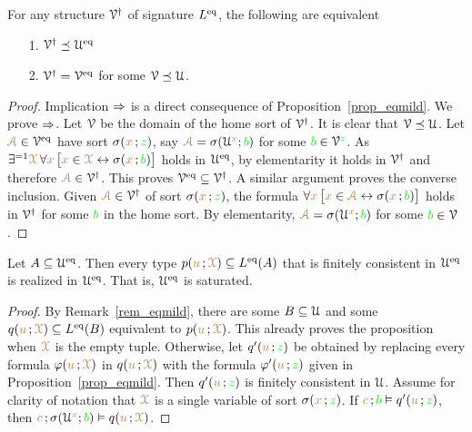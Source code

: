 \begin{proposition}
For any structure $\V^\dag$ of signature $L^\eq$, the following are equivalent\nobreak
\begin{itemize}
\item[1.] $\V^\dag\preceq\U^\eq$
\item[2.] $\V^\dag=\V^\eq$ for some $\V\preceq\U$.
\end{itemize}
\end{proposition}
\begin{proof}
Implication $\IMP$ is a direct consequence of Proposition~\ref{prop_eqmild}.
We prove $\IMP$.
Let $\V$ be the domain of the home sort of $\V^\dag$.
It is clear that $\V\preceq\U$.
Let ${\vl\Aa}\in\V^\eq$ have sort $\sigma({\mr x}\,;{\gr z})$, say ${\vl\Aa}=\sigma(\U^{\mr x};{\gr b})$ for some ${\gr b}\in\V^{\gr z}$.
As $\E^{=1}{\vl\X}\, \A{\mr x}\,\big[{\mr x}\in{\vl\X}\iff\sigma({\mr x}\,;{\gr b})\big]$ holds in $\U^\eq$, by elementarity it holds in $\V^\dag$ and therefore ${\vl\Aa}\in\V^\dag$.
This proves $\V^\eq\subseteq\V^\dag$.
A similar argument proves the converse inclusion.
Given ${\vl\Aa}\in\V^\dag$ of sort $\sigma({\mr x}\,;{\gr z})$, the formula $\A{\mr x}\,\big[{\mr x}\in{\vl\Aa}\iff\sigma({\mr x}\,;{\gr b})\big]$ holds in $\V^\dag$ for some ${\gr b}$ in the home sort.
%
By elementarity, ${\vl\Aa}=\sigma(\U^{\mr x};{\gr b})$ for some ${\gr b}\in\V$.
\end{proof}

\begin{proposition}\label{prop_Ueq_saturated}
Let $A\subseteq\U^\eq$.
Then every type $p({\mr u}\,;{\vl\X})\subseteq L^\eq(A)$ that is finitely consistent in $\U^\eq$ is realized in $\U^\eq$.
That is, $\U^\eq$ is saturated.
\end{proposition}
\begin{proof}
By Remark~\ref{rem_eqmild}, there are some $B\subseteq\U$ and some $q({\mr u}\,;{\vl\X})\subseteq L^\eq(B)$ equivalent to $p({\mr u}\,;{\vl\X})$.
This already proves the proposition when ${\vl\X}$ is the empty tuple.
Otherwise, let $q'({\mr u}\,;{\gr z})$ be obtained by replacing every formula $\phi({\mr u}\,;{\vl\X})$ in $q({\mr u}\,;{\vl\X})$ with the formula $\phi'({\mr u}\,;{\gr z})$ given in Proposition~\ref{prop_eqmild}.
Then $q'({\mr u}\,;{\gr z})$ is finitely consistent in $\U$.
Assume for clarity of notation that ${\vl\X}$ is a single variable of sort $\sigma({\mr x}\,;{\gr z})$.
If ${\mr c}\,;{\gr b}\models q'({\mr u}\,;{\gr z})$, then  ${\mr c}\,;\sigma(\U^{\mr x};{\gr b})\models q({\mr u}\,;{\vl\X})$.
\end{proof}


